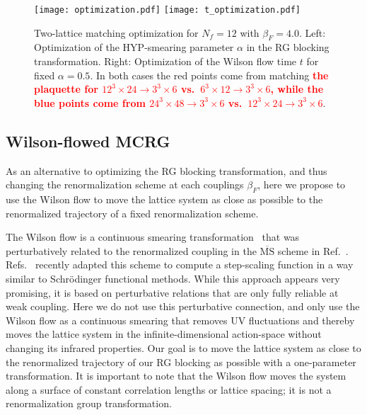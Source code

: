 \documentclass{PoS}
\newcommand{\al}{\ensuremath{\alpha} }
\newcommand{\be}{\ensuremath{\beta} }
\newcommand{\X}{\ensuremath{\!\times\!} }
\newcommand{\MSbar}{\ensuremath{\overline{\textrm{MS}}} }
\newcommand{\refcite}[1]{Ref.~\cite{#1}}
\newcommand{\TODO}[1]{\textcolor{red}{{\bf #1}}}
\begin{document}
\begin{figure}[htpb]
  \centering
  \texttt{[image: optimization.pdf]}\hfill
  \texttt{[image: t\_optimization.pdf]}
  \caption{Two-lattice matching optimization for $N_f = 12$ with $\be_F = 4.0$.  Left: Optimization of the HYP-smearing parameter \al in the RG blocking transformation.  Right: Optimization of the Wilson flow time $t$ for fixed $\al = 0.5$.  In both cases the red points come from matching \TODO{the plaquette for $12^3\X24 \to 3^3\X6$ vs.\ $6^3\X12 \to 3^3\X6$, while the blue points come from $24^3\X48 \to 3^3\X6$ vs.\ $12^3\X24 \to 3^3\X6$}.}
  \label{fig:opt}
\end{figure}



\subsection{\label{sec:WMCRG}Wilson-flowed MCRG} %
As an alternative to optimizing the RG blocking transformation, and thus changing the renormalization scheme at each couplings $\be_F$, here we propose to use the Wilson flow to move the lattice system as close as possible to the renormalized trajectory of a fixed renormalization scheme.

The Wilson flow is a continuous smearing transformation~\cite{Narayanan:2006rf} that was perturbatively related to the renormalized coupling in the \MSbar scheme in \refcite{Luscher:2010iy}.
Refs.~\cite{Fodor:2012td, Fodor:2012qh} recently adapted this scheme to compute a step-scaling function in a way similar to Schr\"odinger functional methods.
While this approach appears very promising, it is based on perturbative relations that are only fully reliable at weak coupling.
Here we do not use this perturbative connection, and only use the Wilson flow as a continuous smearing that removes UV fluctuations and thereby moves the lattice system in the infinite-dimensional action-space without changing its infrared properties.
Our goal is to move the lattice system as close to the renormalized trajectory of our RG blocking as possible with a one-parameter transformation.
It is important to note that the Wilson flow moves the system along a surface of constant correlation lengths or lattice spacing; it is not a renormalization group transformation.
\end{document}
